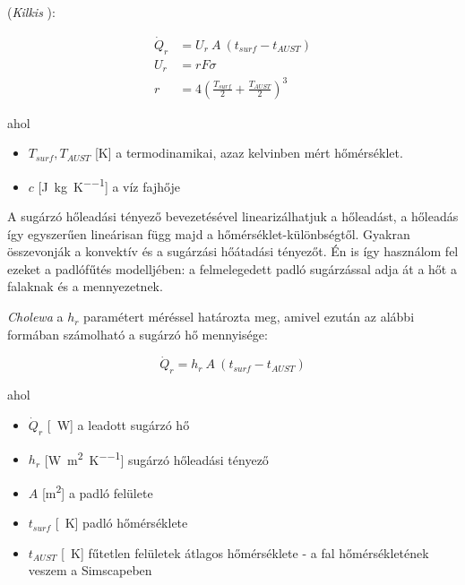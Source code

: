 (\textit{Kilkis} \cite{KILKIS1994} ):

\begin{equation} \label{eq_radiant_kilkis}
\begin{aligned}
\dot Q_{r} &= U_r ~ A~ \left(t_{surf}-t_{AUST}\right)\\[8pt]
U_r&=rF\sigma\\
r&=4 \left(\frac{T_{surf}}{2}+\frac{T_{AUST}}{2}\right)^3
\end{aligned}
\end{equation}


ahol
\begin{itemize}[itemsep=9pt,topsep=0pt,parsep=0pt,partopsep=0pt]
	\item[] $T_{surf}, T_{AUST}$ [\si{\kelvin}] a termodinamikai, azaz kelvinben mért hőmérséklet.
	\item[] $c$ [\si[per-mode = fraction]{\joule\per\kg\per\kelvin}] a víz fajhője
\end{itemize}

A sugárzó hőleadási tényező bevezetésével linearizálhatjuk a hőleadást, a hőleadás így egyszerűen lineárisan függ majd a hőmérséklet-különbségtől. Gyakran összevonják a konvektív és a sugárzási hőátadási tényezőt. Én is így használom fel ezeket a padlófűtés modelljében: a felmelegedett padló sugárzással adja át a hőt a falaknak és a mennyezetnek. 

\textit{Cholewa} \cite{CHOLEWA2013599} a $h_r$ paramétert méréssel határozta meg, amivel ezután az alábbi formában számolható a sugárzó hő mennyisége:



\begin{equation} \label{eq_radiative_hr_linear}
\dot Q_{r} = h_r ~ A ~ \left(t_{surf}-t_{AUST}\right)
\end{equation}

ahol
\begin{itemize}[itemsep=3pt,topsep=0pt,parsep=0pt,partopsep=0pt]
	\item[] $\dot{Q}_{r}$ [\SI{}{\watt}] a leadott sugárzó hő
	\item[] $h_r$ [\si[per-mode = fraction]{\watt\per\meter\squared\per\kelvin}] sugárzó hőleadási tényező
	\item[] $A$ [\si{\metre\squared}] a padló felülete
	\item[] $t_{surf}$ [\SI{}{\kelvin}] padló hőmérséklete
	\item[] $t_{AUST}$ [\SI{}{\kelvin}] fűtetlen felületek átlagos hőmérséklete - a fal hőmérsékletének veszem a Simscapeben
\end{itemize}


